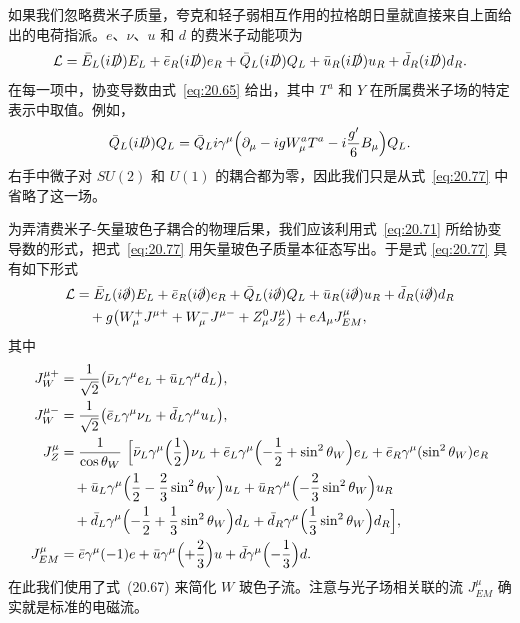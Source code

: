 如果我们忽略费米子质量，夸克和轻子弱相互作用的拉格朗日量就直接来自上面给出的电荷指派。$e$、$\nu$、$u$ 和 $d$ 的费米子动能项为
\begin{equation}
  \mathcal{L} = \bar{E}_L(i\slashed{D})E_L + \bar{e}_R(i\slashed{D})e_R
    + \bar{Q}_L(i\slashed{D})Q_L + \bar{u}_R(i\slashed{D})u_R
    + \bar{d}_R(i\slashed{D})d_R .
  \label{eq:20.77}
\end{equation}
在每一项中，协变导数由式~\eqref{eq:20.65} 给出，其中 $T^a$ 和 $Y$ 在所属费米子场的特定表示中取值。例如，
\begin{equation}
  \bar{Q}_L(i\slashed{D})Q_L = \bar{Q}_L i\gamma^\mu\Bigl( \partial_\mu
    - igW^a_\mu T^a - i\frac{g'}{6}B_\mu \Bigr)Q_L .
  \label{eq:20.78}
\end{equation}
右手中微子对 $SU(2)$ 和 $U(1)$ 的耦合都为零，因此我们只是从式~\eqref{eq:20.77} 中省略了这一场。

为弄清费米子-矢量玻色子耦合的物理后果，我们应该利用式~\eqref{eq:20.71} 所给协变导数的形式，把式~\eqref{eq:20.77} 用矢量玻色子质量本征态写出。于是式 \eqref{eq:20.77} 具有如下形式
\begin{equation}
  \begin{aligned}
    \mathcal{L} &= \bar{E}_L(i\slashed{\partial})E_L + \bar{e}_R(i\slashed{\partial})e_R
      + \bar{Q}_L(i\slashed{\partial})Q_L + \bar{u}_R(i\slashed{\partial})u_R
      + \bar{d}_R(i\slashed{\partial})d_R\\
    &\quad + g\bigl( W^+_\mu J^{\mu+} + W^-_\mu J^{\mu-} + Z^0_\mu J^\mu_Z
      \bigr) + eA_\mu J^\mu_{EM} ,
  \end{aligned}
  \label{eq:20.79}
\end{equation}
其中
\begin{equation}
  \begin{aligned}
    J^{\mu+}_W &= \frac{1}{\sqrt{2}}\bigl( \bar{\nu}_L\gamma^\mu e_L
      + \bar{u}_L\gamma^\mu d_L \bigr),\\
    J^{\mu-}_W &= \frac{1}{\sqrt{2}}\bigl( \bar{e}_L\gamma^\mu\nu_L
      + \bar{d}_L\gamma^\mu u_L \bigr),\\
    J^\mu_Z &= \frac{1}{\cos\theta_W}\ \Bigl[ \bar{\nu}_L\gamma^\mu
      \Bigl( \frac{1}{2} \Bigr)\nu_L + \bar{e}_L\gamma^\mu\Bigl( -\frac{1}{2}
        + \sin^2\theta_W \Bigr)e_L + \bar{e}_R\gamma^\mu(\sin^2\theta_W)e_R\\
    &\quad + \bar{u}_L\gamma^\mu\Bigl( \frac{1}{2} - \frac{2}{3}\sin^2\theta_W
      \Bigr)u_L + \bar{u}_R\gamma^\mu\Bigl( -\frac{2}{3}\sin^2\theta_W
        \Bigr)u_R\\
    &\quad + \bar{d}_L\gamma^\mu\Bigl( -\frac{1}{2} + \frac{1}{3}\sin^2\theta_W
      \Bigr)d_L + \bar{d}_R\gamma^\mu\Bigl( \frac{1}{3}\sin^2\theta_W
        \Bigr)d_R \Bigr],\\
    J^\mu_{EM} &= \bar{e}\gamma^\mu(-1)e + \bar{u}\gamma^\mu\Bigl(
      +\frac{2}{3} \Bigr)u + \bar{d}\gamma^\mu\Bigl( -\frac{1}{3} \Bigr)d .
  \end{aligned}
  \label{eq:20.80}
\end{equation}
在此我们使用了式~(20.67) 来简化 $W$ 玻色子流。注意与光子场相关联的流 $J^\mu_{EM}$ 确实就是标准的电磁流。

